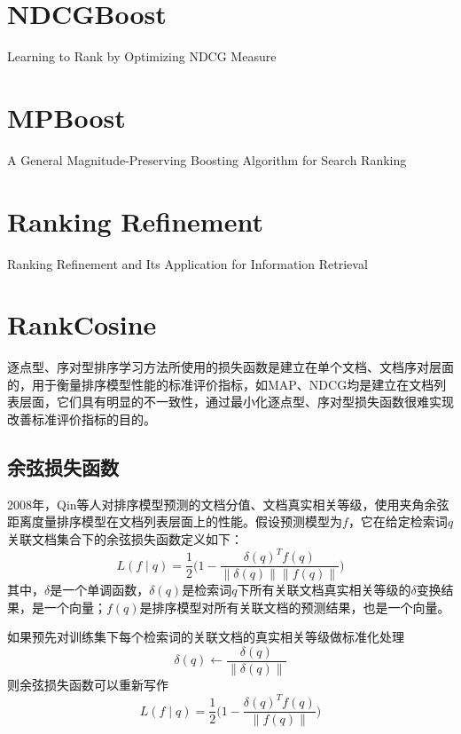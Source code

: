 \section{NDCGBoost}
Learning to Rank by Optimizing NDCG Measure\cite{valizadegan2009learning}

\section{MPBoost}
A General Magnitude-Preserving Boosting Algorithm for Search Ranking\cite{zhu2009general}

\section{Ranking Refinement}
Ranking Refinement and Its Application for Information Retrieval\cite{jin2008ranking}

\section{RankCosine}
逐点型、序对型排序学习方法所使用的损失函数是建立在单个文档、文档序对层面的，用于衡量排序模型性能的标准评价指标，如MAP、NDCG均是建立在文档列表层面，它们具有明显的不一致性，通过最小化逐点型、序对型损失函数很难实现改善标准评价指标的目的。

\subsection{余弦损失函数}
2008年，Qin等人\cite{qin2008query}对排序模型预测的文档分值、文档真实相关等级，使用夹角余弦距离度量排序模型在文档列表层面上的性能。假设预测模型为$f$，它在给定检索词$q$关联文档集合下的余弦损失函数定义如下：
\begin{equation}
    L(f \mid q) = \frac{1}{2} \Big(1 - \frac{\delta(q)^T f(q)}{\|\delta(q)\|\|f(q)\|}\Big)
\end{equation}
其中，$\delta$是一个单调函数，$\delta(q)$是检索词$q$下所有关联文档真实相关等级的$\delta$变换结果，是一个向量；$f(q)$是排序模型对所有关联文档的预测结果，也是一个向量。

如果预先对训练集下每个检索词的关联文档的真实相关等级做标准化处理
\begin{equation}
    \delta(q) \leftarrow \frac{\delta(q)}{\|\delta(q)\|}
\end{equation}
则余弦损失函数可以重新写作
\begin{equation}
    L(f \mid q) = \frac{1}{2} \Big(1 - \frac{\delta(q)^T f(q)}{\|f(q)\|}\Big)
\end{equation}

